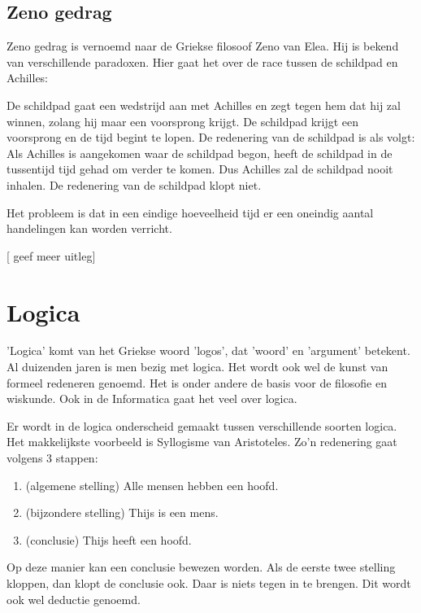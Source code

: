 \documentclass{article}
\begin{document}
		\subsection{Zeno gedrag}
		
		Zeno gedrag is vernoemd naar de Griekse filosoof Zeno van Elea. Hij is bekend van verschillende paradoxen. Hier gaat het over de race tussen de schildpad en Achilles:
		
		De schildpad gaat een wedstrijd aan met Achilles en zegt tegen hem dat hij zal winnen, zolang hij maar een voorsprong krijgt. De schildpad krijgt een voorsprong en de tijd begint te lopen. De redenering van de schildpad is als volgt: Als Achilles is aangekomen waar de schildpad begon, heeft de schildpad in de tussentijd tijd gehad om verder te komen. Dus Achilles zal de schildpad nooit inhalen. De redenering van de schildpad klopt niet.

		Het probleem is dat in een eindige hoeveelheid tijd er een oneindig aantal handelingen kan worden verricht.


		[ geef meer uitleg]
		
	\newpage
	
	
	\section{Logica}
	
	'Logica' komt van het Griekse woord 'logos', dat 'woord' en 'argument' betekent. Al duizenden jaren is men bezig met logica. Het wordt ook wel de kunst van formeel redeneren genoemd. Het is onder andere de basis voor de filosofie en wiskunde. Ook in de Informatica gaat het veel over logica.

	Er wordt in de logica onderscheid gemaakt tussen verschillende soorten logica. Het makkelijkste voorbeeld is Syllogisme van Aristoteles. Zo'n redenering gaat volgens 3 stappen:

	\begin{enumerate}
		\item (algemene stelling) Alle mensen hebben een hoofd.
		\item (bijzondere stelling) Thijs is een mens.
		\item (conclusie) Thijs heeft een hoofd.
	\end{enumerate}

	Op deze manier kan een conclusie bewezen worden. Als de eerste twee stelling kloppen, dan klopt de conclusie ook. Daar is niets tegen in te brengen. Dit wordt ook wel deductie genoemd.
\end{document}
